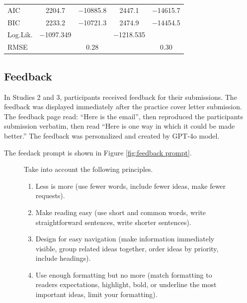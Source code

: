 \documentclass[11pt]{report}
\begin{document}
\begin{append}
\begin{table}[ht]
\begin{tabular}{lcccc}
AIC                                                                              & \num{2204.7}    & \num{-10885.8}  & \num{2447.1}    & \num{-14615.7} \\
BIC                                                                              & \num{2233.2}    & \num{-10721.3}  & \num{2474.9}    & \num{-14454.5} \\
Log.Lik.                                                                         & \num{-1097.349} &                  & \num{-1218.535} &                 \\
RMSE                                                                             &                  & \num{0.28}      &                  & \num{0.30}     \\
\bottomrule
    \end{tabular}
    \label{tab:beta}
\end{table}


\subsection{Feedback}\label{sec:feedback}

In Studies 2 and 3, participants received feedback for their submissions. The feedback was displayed immediately after the practice cover letter submission. The feedback page read: ``Here is the email'', then reproduced the participants submission verbatim, then read ``Here is one way in which it could be made better.'' The feedback was personalized and created by GPT-4o model. 

The feedack prompt is shown in Figure \ref{fig:feedback prompt}.
\begin{figure}[ht]
    \centering
    \begin{tcolorbox}[colback=blue!5!white, colframe=blue!75!black, title=Feedback prompt]
Take into account the following principles. 
\begin{enumerate}
    \item Less is more (use fewer words, include fewer ideas, make fewer requests).

\item Make reading easy (use short and common words, write straightforward sentences, write shorter sentences).

\item Design for easy navigation (make information immediately visible, group related ideas together, order ideas by priority, include headings).

\item Use enough formatting but no more (match formatting to readers expectations, highlight, bold, or underline the most important ideas, limit your formatting).


\end{enumerate}
\end{tcolorbox}
\end{figure}
\end{append}
\end{document}

